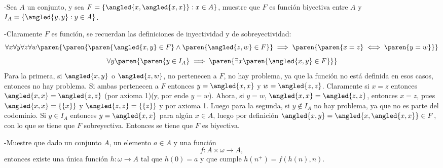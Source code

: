 \begin{prob}
    -Sea \(A\) un conjunto, y sea \(F=\{\angled{x,\angled{x,x}}:x\in A\}\), muestre que \(F\) es función biyectiva entre \(A\) y \(I_A=\{\angled{y,y}:y\in A\}\).
\end{prob}

\begin{sol}
    -Claramente \(F\) es función, se recuerdan las definiciones de inyectividad y de sobreyectividad:
    \[
        \forall x\forall y\forall z\forall w\paren{\paren{\paren{\angled{x,y}\in F}\wedge\paren{\angled{z,w}\in F}}\implies\paren{\paren{x=z}\iff\paren{y=w}}}
    \]
    \[
        \forall y\paren{\paren{y\in I_A}\implies\paren{\exists x\paren{\angled{x,y}\in F}}}
    \]
    Para la primera, si \(\angled{x,y}\) o \(\angled{z,w}\), no pertenecen a \(F\), no hay problema, ya que la función no está definida en esos casos, entonces no hay problema. Si ambas pertenecen a \(F\) entonces \(y=\angled{x,x}\) y \(w=\angled{z,z}\). Claramente si \(x=z\) entonces \(\angled{x,x} = \angled{z,z}\) (por axioma 1)(y, por ende \(y = w\)). Ahora, si \(y = w\), \(\angled{x,x} = \angled{z,z}\), entonces \(x=z\), pues \(\angled{x,x} = \{\{x\}\}\) y \(\angled{z,z} = \{\{z\}\}\) y por axioma 1. Luego para la segunda, si \(y\notin I_A\) no hay problema, ya que no es parte del codominio. Si \(y\in I_A\) entonces \(y=\angled{x,x}\) para algún \(x\in A\), luego por definición \(\angled{x,y}=\angled{x,\angled{x,x}}\in F\), con lo que se tiene que \(F\) sobreyectiva. Entonces se tiene que \(F\) es biyectiva.
\end{sol}

\begin{prob}
    -Muestre que dado un conjunto \(A\), un elemento \(a\in A\) y una función
    \[
        f:A\times\omega\rightarrow A,
    \]
    entonces existe una única función \(h:\omega\rightarrow A\) tal que \(h(0)=a\) y que cumple \(h(n^+)=f(h(n),n)\).
\end{prob}

